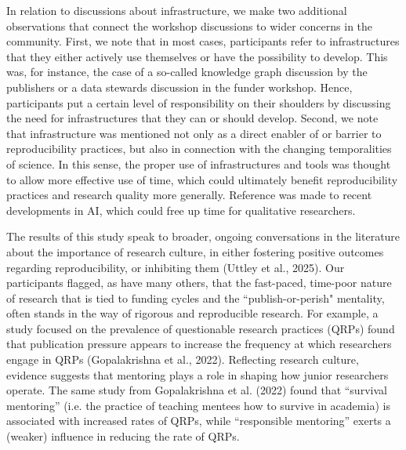 \documentclass[authordate, meta]{jote-new-article}
\begin{document}
	In relation to discussions about infrastructure, we make two additional observations that connect the workshop discussions to wider concerns in the community. First, we note that in most cases, participants refer to infrastructures that they either actively use themselves or have the possibility to develop. This was, for instance, the case of a so-called knowledge graph discussion by the publishers or a data stewards discussion in the funder workshop. Hence, participants put a certain level of responsibility on their shoulders by discussing the need for infrastructures that they can or should develop. Second, we note that infrastructure was mentioned not only as a direct enabler of or barrier to reproducibility practices, but also in connection with the changing temporalities of science. In this sense, the proper use of infrastructures and tools was thought to allow more effective use of time, which could ultimately benefit reproducibility practices and research quality more generally. Reference was made to recent developments in AI, which could free up time for qualitative researchers.



	The results of this study speak to broader, ongoing conversations in the literature about the importance of research culture, in either fostering positive outcomes regarding reproducibility, or inhibiting them (Uttley et al., 2025). Our participants flagged, as have many others, that the fast-paced, time-poor nature of research that is tied to funding cycles and the “publish-or-perish" mentality, often stands in the way of rigorous and reproducible research. For example, a study focused on the prevalence of questionable research practices (QRPs) found that publication pressure appears to increase the frequency at which researchers engage in QRPs (Gopalakrishna et al., 2022). Reflecting research culture, evidence suggests that mentoring plays a role in shaping how junior researchers operate. The same study from Gopalakrishna et al. (2022) found that “survival mentoring” (i.e. the practice of teaching mentees how to survive in academia) is associated with increased rates of QRPs, while “responsible mentoring” exerts a (weaker) influence in reducing the rate of QRPs.
\end{document}
